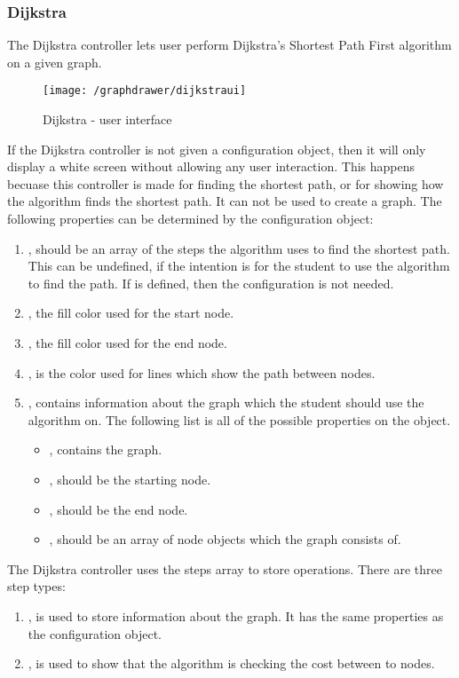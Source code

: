 \subsubsection{Dijkstra}
The Dijkstra controller lets user perform Dijkstra's Shortest Path First algorithm on a given graph.
\begin{figure}[H]
    \centering
    \texttt{[image: /graphdrawer/dijkstraui]}
    \caption{Dijkstra - user interface}
    \label{fig:graphdrawerDijkstraUserInterface}
\end{figure}
If the Dijkstra controller is not given a configuration object, then it will only display a white screen without allowing any user interaction. This happens becuase this controller is made for finding the shortest path, or for showing how the algorithm finds the shortest path. It can not be used to create a graph. The following properties can be determined by the configuration object:
\begin{enumerate}
    \item {}, should be an array of the steps the algorithm uses to find the shortest path. This can be undefined, if the intention is for the student to use the algorithm to find the path. If  is defined, then the  configuration is not needed.
    \item {}, the fill color used for the start node.
    \item {}, the fill color used for the end node.
    \item {}, is the color used for lines which show the path between nodes.
    \item {}, contains information about the graph which the student should use the algorithm on. The following list is all of the possible properties on the  object.
    \begin{itemize}
        \item {}, contains the graph.
        \item {}, should be the starting node.
        \item {}, should be the end node.
        \item {}, should be an array of node objects which the graph consists of.
    \end{itemize}
\end{enumerate}
The Dijkstra controller uses the steps array to store operations. There are three step types:
\begin{enumerate}
    \item {}, is used to store information about the graph. It has the same properties as the  configuration object.
    \item {}, is used to show that the algorithm is checking the cost between to nodes. 
\end{enumerate}
